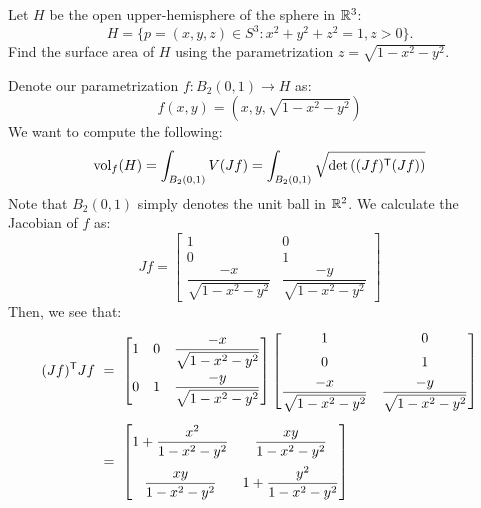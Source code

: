 \documentclass{article}
\begin{document}
\setcounter{subsection}{14}
\setcounter{qu}{9}

\begin{qu}[title=Part a)]
    Let $H$ be the open upper-hemisphere of the sphere in $\mathbb{R}^3$:
        \[ H = \{p=(x,y,z)\in S^3 :x^2+y^2+z^2=1, z>0\}. \]
        Find the surface area of $H$ using the parametrization $z=\sqrt{1-x^2-y^2}$.
\end{qu}

\begin{soln}
    Denote our parametrization $ f: B_{2}(0, 1) \rightarrow H $ as:
    \begin{equation*}
        f(x, y) = (x, y, \sqrt{1 - x^{2} - y^{2}})
    \end{equation*}
    We want to compute the following:
    \begin{equation*}
        \textrm{vol}_{f}(H) = \int_{B_{2}(0, 1)}V(Jf)
        = \int_{B_{2}(0, 1)}\sqrt{\det\left((Jf)^{\mathsf{T}}(Jf)\right)}
    \end{equation*}
    Note that $ B_{2}(0, 1) $ simply denotes the unit ball in $ \mathbb{R}^{2} $. \vsp
    We calculate the Jacobian of $ f $ as:
    \begin{equation*}
        Jf =
        \begin{bmatrix}
            1 & 0 \\
            0 & 1 \\
            \dfrac{-x}{\sqrt{1-x^{2}-y^{2}}} & \dfrac{-y}{\sqrt{1-x^{2}-y^{2}}}
        \end{bmatrix}
    \end{equation*}
    Then, we see that:
    \begin{align*}
        (Jf)^{\msf{T}}Jf & \ = \
        \begin{bmatrix}
            1 & 0 & \dfrac{-x}{\sqrt{1-x^{2}-y^{2}}} \\[0.15in]
            0 & 1 & \dfrac{-y}{\sqrt{1-x^{2}-y^{2}}}
        \end{bmatrix}
        \begin{bmatrix}
            1 & 0 \vsp
            0 & 1 \vsp
            \dfrac{-x}{\sqrt{1-x^{2}-y^{2}}} & \dfrac{-y}{\sqrt{1-x^{2}-y^{2}}}
        \end{bmatrix} \vsp
                         & \ = \
        \begin{bmatrix}
            1 + \dfrac{x^{2}}{1-x^{2}-y^{2}} & \dfrac{xy}{1-x^{2}-y^{2}} \\[0.15in]
            \dfrac{xy}{1-x^{2}-y^{2}} & 1+\dfrac{y^{2}}{1-x^{2}-y^{2}}
        \end{bmatrix}

\end{align*}
\end{soln}
\end{document}
